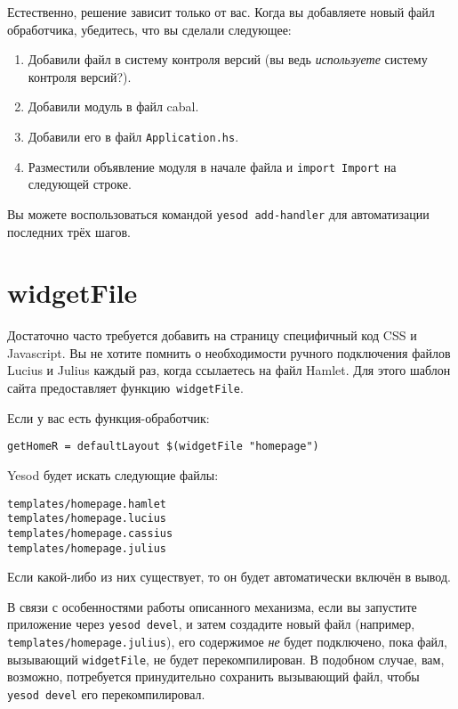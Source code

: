 Естественно, решение зависит только от вас. Когда вы добавляете новый файл
обработчика, убедитесь, что вы сделали следующее:
\begin{enumerate}
  \item Добавили файл в систему контроля версий (вы ведь \emph{используете}
      систему контроля версий?).
  \item Добавили модуль в файл cabal.
  \item Добавили его в файл \texttt{Application.hs}.
  \item Разместили объявление модуля в начале файла и \lstinline!import Import!
      на следующей строке.
\end{enumerate}

Вы можете воспользоваться командой \texttt{yesod add-handler} для автоматизации
последних трёх шагов.

\section{widgetFile}
Достаточно часто требуется добавить на страницу специфичный код CSS и
Javascript.  Вы не хотите помнить о необходимости ручного подключения файлов
Lucius и Julius каждый раз, когда ссылаетесь на файл Hamlet. Для этого шаблон
сайта предоставляет функцию~\lstinline!widgetFile!.

Если у вас есть функция-обработчик:
\begin{lstlisting}
getHomeR = defaultLayout $(widgetFile "homepage")
\end{lstlisting}%
Yesod будет искать следующие файлы:
\begin{lstlisting}
templates/homepage.hamlet
templates/homepage.lucius
templates/homepage.cassius
templates/homepage.julius
\end{lstlisting}

Если какой-либо из них существует, то он будет автоматически включён в вывод.

\begin{remark}
В связи с особенностями работы описанного механизма, если вы запустите приложение
через \texttt{yesod devel}, и затем создадите новый файл (например,
\texttt{templates/homepage.julius}), его содержимое \emph{не} будет подключено,
пока файл, вызывающий \lstinline!widgetFile!, не будет перекомпилирован.  В
подобном случае, вам, возможно, потребуется принудительно сохранить вызывающий файл,
чтобы \texttt{yesod devel} его перекомпилировал.
\end{remark}

